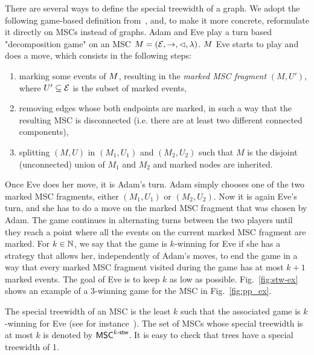 There are several ways to define the special treewidth of a graph.
We adopt the following game-based definition from~\cite{DBLP:journals/corr/abs-1904-06942},
and, to make it more concrete, reformulate it directly on MSCs instead of graphs.
Adam and Eve play a turn based "decomposition game" on an MSC $M = (\mathcal{E}, \to, \lhd, \lambda)$. $M$
Eve starts to play and does a move, which consists in the following steps:
\begin{enumerate}
	\item marking some events of $M$, resulting in the \emph{marked MSC fragment} $(M, U')$, where $U' \subseteq \mathcal{E}$ is the subset of marked events,
	\item removing edges whose both endpoints are marked, in such a way that the resulting MSC is disconnected (i.e. there are at least two different connected components),
	\item splitting $(M, U)$ in $(M_1, U_1)$ and $(M_2, U_2)$ such that $M$ is the disjoint (unconnected) union of $M_1$ and $M_2$
	and marked nodes are inherited.
\end{enumerate}
Once Eve does her move, it is Adam's turn. Adam simply chooses one of the two marked MSC fragments, either $(M_1, U_1)$ or $(M_2, U_2)$. Now it is again Eve's turn, and she has to do a move on the marked MSC fragment that was chosen by Adam. The game continues in alternating turns between the two players until they reach a point where all the events on the current marked MSC fragment are marked.
For $k \in \mathbb{N}$, we say that the game is $k$-winning for Eve if she has a strategy that allows her, independently of Adam's moves, to end the game in a way that every marked MSC fragment visited during the game has at most $k+1$ marked events. The goal of Eve is to keep $k$ as low as possible. Fig.~\ref{fig:stw-ex} shows an example of a 3-winning game for the MSC in Fig.~\ref{fig:pp_ex}.

The special treewidth of an MSC is the least $k$ such that
the associated game is $k$-winning for Eve
(see for instance~\cite{DBLP:journals/corr/abs-1904-06942}).
The set of MSCs whose special treewidth is at most $k$ is denoted by $\mathsf{MSC}^{k\textup{-}\mathsf{stw}}$. It is easy to check that trees have a special treewidth of 1.

